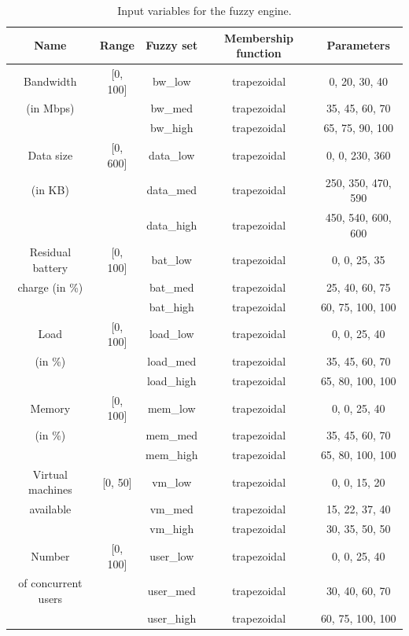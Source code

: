 \begin{table}[H]
  \centering
  \begin{tabular}{|c|c|c|c|c|}
    \hline
    Name                & Range    & Fuzzy set & Membership function & Parameters         \\
    \hline
    Bandwidth           & [0, 100] & bw_low    & trapezoidal         & 0, 20, 30, 40      \\
    (in Mbps)           &          & bw_med    & trapezoidal         & 35, 45, 60, 70     \\
                        &          & bw_high   & trapezoidal         & 65, 75, 90, 100    \\
    \hline
    Data size           & [0, 600] & data_low  & trapezoidal         & 0, 0, 230, 360     \\
    (in KB)             &          & data_med  & trapezoidal         & 250, 350, 470, 590 \\
                        &          & data_high & trapezoidal         & 450, 540, 600, 600 \\
    \hline
    Residual battery    & [0, 100] & bat_low   & trapezoidal         & 0, 0, 25, 35       \\
    charge (in \%)      &          & bat_med   & trapezoidal         & 25, 40, 60, 75     \\
                        &          & bat_high  & trapezoidal         & 60, 75, 100, 100   \\
    \hline
    Load                & [0, 100] & load_low  & trapezoidal         & 0, 0, 25, 40       \\
    (in \%)             &          & load_med  & trapezoidal         & 35, 45, 60, 70     \\
                        &          & load_high & trapezoidal         & 65, 80, 100, 100   \\
    \hline
    Memory              & [0, 100] & mem_low   & trapezoidal         & 0, 0, 25, 40       \\
    (in \%)             &          & mem_med   & trapezoidal         & 35, 45, 60, 70     \\
                        &          & mem_high  & trapezoidal         & 65, 80, 100, 100   \\
    \hline
    Virtual machines    & [0, 50]  & vm_low    & trapezoidal         & 0, 0, 15, 20       \\
    available           &          & vm_med    & trapezoidal         & 15, 22, 37, 40     \\
                        &          & vm_high   & trapezoidal         & 30, 35, 50, 50     \\
    \hline
    Number              & [0, 100] & user_low  & trapezoidal         & 0, 0, 25, 40       \\
    of concurrent users &          & user_med  & trapezoidal         & 30, 40, 60, 70     \\
                        &          & user_high & trapezoidal         & 60, 75, 100, 100   \\
    \hline
  \end{tabular}
  \caption{Input variables for the fuzzy engine.}
  \label{tab:fuzzy-input}
\end{table}


